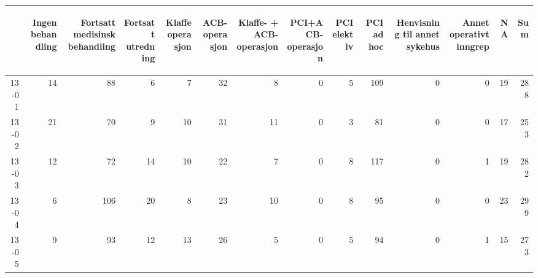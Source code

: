 \documentclass[presentation,xcolor=pdftex,dvipsnames,table]{beamer}
\begin{document}
\begin{frame}
\begin{tiny}
\begin{table}[ht]
\centering
\begin{tabular}{rrrrrrrrrrrrrr}
  \toprule
 & \begin{sideways} Ingen behandling \end{sideways} & \begin{sideways} Fortsatt medisinsk behandling \end{sideways} & \begin{sideways} Fortsatt utredning \end{sideways} & \begin{sideways} Klaffeoperasjon \end{sideways} & \begin{sideways} ACB-operasjon \end{sideways} & \begin{sideways} Klaffe- + ACB-operasjon \end{sideways} & \begin{sideways} PCI+ACB-operasjon \end{sideways} & \begin{sideways} PCI elektiv \end{sideways} & \begin{sideways} PCI ad hoc \end{sideways} & \begin{sideways} Henvisning til annet sykehus \end{sideways} & \begin{sideways} Annet operativt inngrep \end{sideways} & \begin{sideways} NA \end{sideways} & \begin{sideways} Sum \end{sideways} \\ 
  \midrule
13-01 & 14 & 88 & 6 & 7 & 32 & 8 & 0 & 5 & 109 & 0 & 0 & 19 & 288 \\ 
  13-02 & 21 & 70 & 9 & 10 & 31 & 11 & 0 & 3 & 81 & 0 & 0 & 17 & 253 \\ 
  13-03 & 12 & 72 & 14 & 10 & 22 & 7 & 0 & 8 & 117 & 0 & 1 & 19 & 282 \\ 
  13-04 & 6 & 106 & 20 & 8 & 23 & 10 & 0 & 8 & 95 & 0 & 0 & 23 & 299 \\ 
  13-05 & 9 & 93 & 12 & 13 & 26 & 5 & 0 & 5 & 94 & 0 & 1 & 15 & 273 \\ 

\end{tabular}
\end{table}
\end{tiny}
\end{frame}
\end{document}
